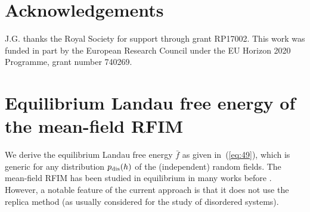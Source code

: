 \documentclass{iopart}
\newcommand{\eqref}[1]{(\ref{#1})}
\begin{document}
\section*{Acknowledgements}

J.G. thanks the Royal Society for support through grant RP17002.
This work was funded in part by the European Research Council under the EU Horizon 2020 Programme,
grant number 740269.

\appendix

\section{Equilibrium Landau free energy of the mean-field RFIM}
\label{app:eq_landau_free_en}

We derive the equilibrium Landau free energy $\bar{f}$ as given in~\eqref{eq:49}, which is generic for any distribution $p_{\rm dis}(h)$ of the (independent) random fields.
%
The mean-field RFIM has been studied in equilibrium in many works before \cite{schneider1977random,luttinger1976exactly,aharony1978tricritical,krapivsky2010kinetic}.  However, a notable feature of the current approach is that it does not use the replica method (as usually considered for the study of disordered systems).
\end{document}
